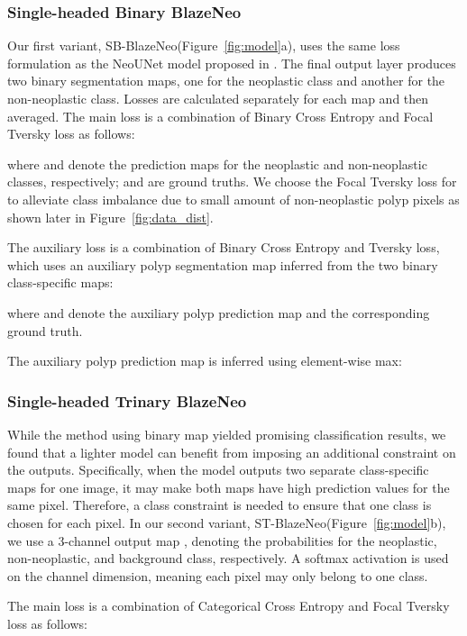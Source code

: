 \documentclass{ieeeaccess}
\newcommand{\ModelName}{BlazeNeo\xspace}
\begin{document}
\subsubsection{Single-headed Binary \ModelName}
Our first variant, SB-\ModelName (Figure~\ref{fig:model}a), uses the same loss formulation as the NeoUNet model proposed in \cite{lan2021neounet}. The final output layer produces two binary segmentation maps, one for the neoplastic class and another for the non-neoplastic class. Losses are calculated separately for each map and then averaged. The main loss is a combination of Binary Cross Entropy and Focal Tversky loss \cite{abraham2019novel} as follows:

where  and  denote the prediction maps for the neoplastic and non-neoplastic classes, respectively;  and  are ground truths. We choose the Focal Tversky loss for  to alleviate class imbalance due to small amount of non-neoplastic polyp pixels as shown later in Figure~\ref{fig:data_dist}.

The auxiliary loss is a combination of Binary Cross Entropy and Tversky loss, which uses an auxiliary polyp segmentation map inferred from the two binary class-specific maps:

where  and  denote the auxiliary polyp prediction map and the corresponding ground truth.

The auxiliary polyp prediction map  is inferred using element-wise max:




\subsubsection{Single-headed Trinary \ModelName}
While the method using binary map \cite{lan2021neounet} yielded promising classification results, we found that a lighter model can benefit from imposing an additional constraint on the outputs.
Specifically, when the model outputs two separate class-specific maps for one image, it may make both maps have high prediction values for the same pixel. Therefore, a class constraint is needed to ensure that one class is chosen for each pixel. In our second variant, ST-\ModelName (Figure~\ref{fig:model}b), we use a 3-channel output map , denoting the probabilities for the neoplastic, non-neoplastic, and background class, respectively. A softmax activation is used on the channel dimension, meaning each pixel may only belong to one class.

The main loss is a combination of Categorical Cross Entropy and Focal Tversky loss as follows:
\end{document}
